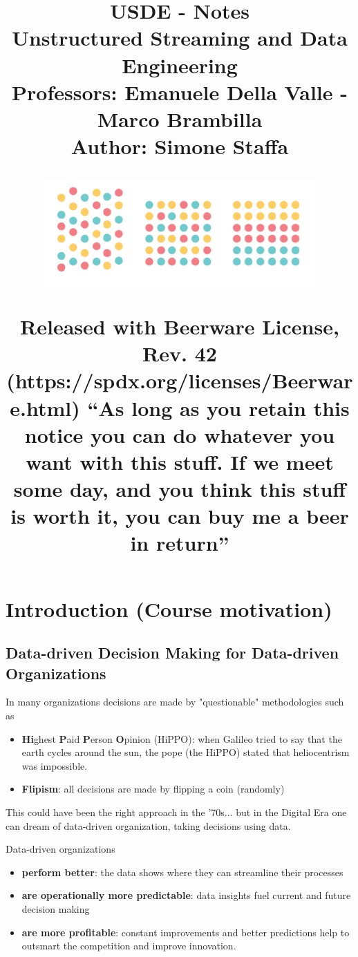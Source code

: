 \documentclass[10pt,a4paper]{article}
\title{{\Huge\textbf{USDE - Notes}
\\ \LARGE Unstructured Streaming and Data Engineering
\vspace{0.5em}
\\ \large \textbf{Professors}: Emanuele Della Valle - Marco Brambilla  \linebreak
\\ \small \textbf{Author}: Simone Staffa \linebreak

\vspace{5em}
\begin{figure}[h!]
 \hfill \includegraphics[width=300pt]{images/cover.png}\hspace*{\fill}
  \label{fig:polimi}
\end{figure}
}
\vspace{1em}
\small{
Released with Beerware License, Rev. 42 (https://spdx.org/licenses/Beerware.html) \linebreak
“As long as you retain this notice you can do whatever you want with this stuff. If we meet some day, and you think this stuff is worth it, you can buy me a beer in return”}
}
\begin{document}
\maketitle
\clearpage
\tableofcontents
\clearpage
\section{Introduction (Course motivation)}
\subsection{Data-driven Decision Making for Data-driven Organizations}
In many organizations decisions are made by "questionable" methodologies such as
\begin{itemize}
	\item \textbf{Hi}ghest \textbf{P}aid \textbf{P}erson \textbf{O}pinion (HiPPO): when Galileo tried to say that the earth cycles around the sun, the pope (the HiPPO) stated that heliocentrism was impossible.
	\item \textbf{Flipism}: all decisions are made by flipping a coin (randomly)
\end{itemize}
This could have been the right approach in the '70s... but in the Digital Era one can dream of data-driven organization, taking decisions using data.
\\ \vspace{0.5em}\raggedright
Data-driven organizations
\begin{itemize}
	\item \textbf{perform better}: the data shows where they can streamline their processes
	\item \textbf{are operationally more predictable}: data insights fuel current and future decision making
	\item \textbf{are more profitable}: constant improvements and better predictions help to outsmart the competition and improve innovation.
\end{itemize}
\end{document}
